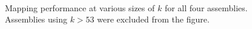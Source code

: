 \documentclass[11pt]{article}
\begin{document}
\begin{figure}[t]
\centering

\\

\caption{Mapping performance at various sizes of $k$ for all four assemblies.  Assemblies using 
$k>53$ were excluded from the figure.}
\label{f:mapping_performance}
\end{figure}
\end{document}
